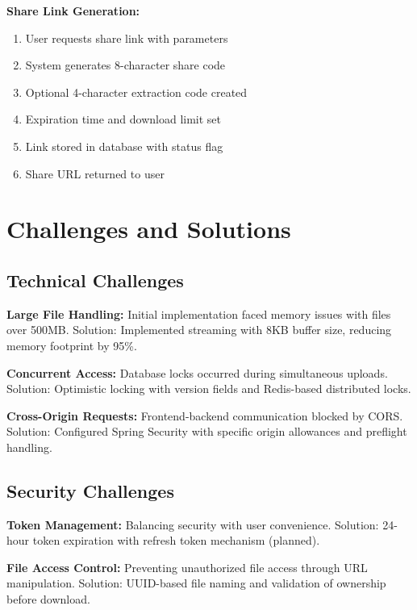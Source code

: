 \documentclass[final]{cvpr}
\begin{document}
\textbf{Share Link Generation:}
\begin{enumerate}
    \item User requests share link with parameters
    \item System generates 8-character share code
    \item Optional 4-character extraction code created
    \item Expiration time and download limit set
    \item Link stored in database with status flag
    \item Share URL returned to user
\end{enumerate}

\section{Challenges and Solutions}
\label{sec:challenges}

\subsection{Technical Challenges}

\textbf{Large File Handling:} Initial implementation faced memory issues with files over 500MB. Solution: Implemented streaming with 8KB buffer size, reducing memory footprint by 95\%.

\textbf{Concurrent Access:} Database locks occurred during simultaneous uploads. Solution: Optimistic locking with version fields and Redis-based distributed locks.

\textbf{Cross-Origin Requests:} Frontend-backend communication blocked by CORS. Solution: Configured Spring Security with specific origin allowances and preflight handling.

\subsection{Security Challenges}

\textbf{Token Management:} Balancing security with user convenience. Solution: 24-hour token expiration with refresh token mechanism (planned).

\textbf{File Access Control:} Preventing unauthorized file access through URL manipulation. Solution: UUID-based file naming and validation of ownership before download.

\end{document}
